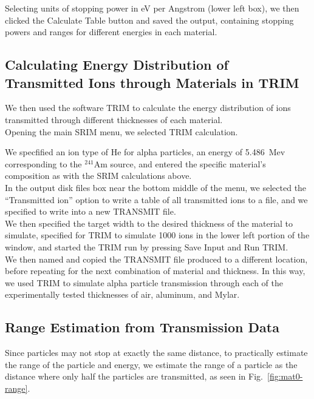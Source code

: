 \documentclass[12pt]{article}
\newcommand{\figref}[1]{Fig.~\ref{#1}}
\newcommand{\AmSrc}{\xspace$^{241}$Am\xspace}
\begin{document}
Selecting units of stopping power in eV per Angstrom (lower left box), we then clicked the Calculate Table button and saved the output, containing stopping powers and ranges for different energies in each material.

\subsection{Calculating Energy Distribution of Transmitted Ions through Materials in TRIM}

We then used the software TRIM to calculate the energy distribution of ions transmitted through different thicknesses of each material.\\

Opening the main SRIM menu, we selected TRIM calculation.

We specfified an ion type of He for alpha particles, an energy of 5.486~Mev corresponding to the \AmSrc source, and entered the specific material's composition as with the SRIM calculations above.\\

In the output disk files box near the bottom middle of the menu, we selected the ``Transmitted ion'' option to write a table of all transmitted ions to a file, and we specified to write into a new TRANSMIT file.\\

We then specified the target width to the desired thickness of the material to simulate, specified for TRIM to simulate 1000 ions in the lower left portion of the window, and started the TRIM run by pressing Save Input and Run TRIM.\\

We then named and copied the TRANSMIT file produced to a different location, before repeating for the next combination of material and thickness.
In this way, we used TRIM to simulate alpha particle transmission through each of the experimentally tested thicknesses of air, aluminum, and Mylar.
\subsection{Range Estimation from Transmission Data}


\FloatBarrier
Since particles may not stop at exactly the same distance, to practically estimate the range of the particle and energy, we estimate the range of a particle as the distance where only half the particles are transmitted, as seen in \figref{fig:mat0-range}.\\
\end{document}
